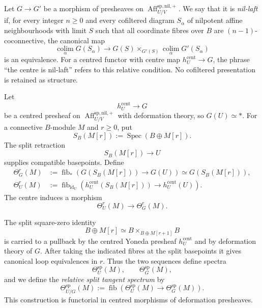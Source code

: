 \begin{definition}
\label{def:bnli-nil-laft}
Let $G\to G'$ be a morphism of presheaves on
$\operatorname{Aff}^{\mathrm{sp,nil,+}}_{U/V}$.  We say that it is
\emph{nil-laft} if, for every integer $n\geq0$ and every cofiltered diagram
$S_\alpha$ of nilpotent affine neighbourhoods with limit $S$ such that all
coordinate fibres over $B$ are $(n-1)$-coconnective, the canonical map
\[
\boxed{
    \operatorname*{colim}_\alpha G(S_\alpha)
    \longrightarrow
    G(S)\times_{G'(S)}
    \operatorname*{colim}_\alpha G'(S_\alpha)}
\]
is an equivalence.  For a centred functor with centre map
$h_U^{\mathrm{cent}}\to G$, the phrase ``the centre is nil-laft'' refers to
this relative condition.  No cofiltered presentation is retained as structure.
\end{definition}


\begin{construction}
\label{con:bnli-relative-split-tangent}
Let
\[
    h_U^{\mathrm{cent}}\longrightarrow G
\]
be a centred presheaf on
$\operatorname{Aff}^{\mathrm{sp,nil,+}}_{U/V}$ with deformation theory, so
$G(U)\simeq *$.  For a connective $B$-module $M$ and $r\geq0$, put
\[
    S_B(M[r])
    :=
    \operatorname{Spec}(B\oplus M[r]).
\]
The split retraction
\[
    S_B(M[r])\longrightarrow U
\]
supplies compatible basepoints.  Define
\[
\begin{aligned}
    \Theta_G^r(M)
    &:=
    \operatorname{fib}_{*}
    \left(
      G(S_B(M[r]))\longrightarrow G(U)
    \right)
    \simeq G(S_B(M[r])),\\
    \Theta_U^r(M)
    &:=
    \operatorname{fib}_{\operatorname{id}_U}
    \left(
      h_U^{\mathrm{cent}}(S_B(M[r]))
      \longrightarrow h_U^{\mathrm{cent}}(U)
    \right).
\end{aligned}
\]
The centre induces a morphism
\[
    \Theta_U^r(M)\longrightarrow\Theta_G^r(M).
\]

The split square-zero identity
\[
    B\oplus M[r]
    \simeq
    B\times_{B\oplus M[r+1]}B
\]
is carried to a pullback by the centred Yoneda presheaf
$h_U^{\mathrm{cent}}$ and by deformation theory of $G$.  After taking the indicated fibres at the split basepoints it
gives canonical loop equivalences in $r$.  Thus the two sequences define
spectra
\[
    \Theta_U^{\mathrm{sp}}(M),
    \qquad
    \Theta_G^{\mathrm{sp}}(M),
\]
and we define the \emph{relative split tangent spectrum} by
\[
\boxed{
    \Theta_{U/G}^{\mathrm{sp}}(M)
    :=
    \operatorname{fib}
    \left(
      \Theta_U^{\mathrm{sp}}(M)
      \longrightarrow
      \Theta_G^{\mathrm{sp}}(M)
    \right).}
\]
This construction is functorial in centred morphisms of deformation
presheaves.
\end{construction}

